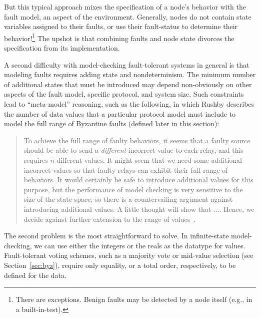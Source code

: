 \documentclass{llncs/llncs}
\newcommand{\lee}[1]{ } %
\newcommand{\lee}[1]{ {\color{blue}$<$lee: #1$>$} } %
\begin{document}

\noindent
But this typical approach mixes the specification of a node's behavior with the fault model, an aspect of the environment. Generally, nodes do not contain state variables assigned to their faults, or use their fault-status to determine their behavior!\footnote{There are exceptions. Benign faults may be detected by a node itself (e.g., in a built-in-test).} The upshot is that combining faults and node state divorces the specification from its implementation.

A second difficulty with model-checking fault-tolerant systems in general is that modeling faults requires adding state and nondeterminism. The minimum number of additional states that must be introduced may depend non-obviously on other aspects of the fault model, specific protocol, and system size. Such constraints lead to ``meta-model'' reasoning, such as the following, in which Rushby describes the number of data values that a particular protocol model must include to model the full range of Byzantine faults (defined later in this section):

\begin{quote}
To achieve the full range of faulty behaviors, it seems that a faulty source should be able to send a \emph{different} incorrect value to each relay, and this requires $n$ different values. It might seem that we need some additional incorrect values so that faulty relays can exhibit their full range of behaviors. It would certainly be safe to introduce additional values for this purpose, but the performance of model checking is very sensitive to the size of the state space, so there is a countervailing argument against introducing additional values. A little thought will show that $\ldots$. Hence, we decide against further extension to the range of values~\cite{Rushby:OM1}.
\end{quote}

The second problem is the most straightforward to solve. In infinite-state model-checking, we can use either the integers or the reals as the datatype for values. Fault-tolerant voting schemes, such as a majority vote or mid-value selection (see Section~\ref{sec:byz}), require only equality, or a total order, respectively, to be defined for the data.
\end{document}
